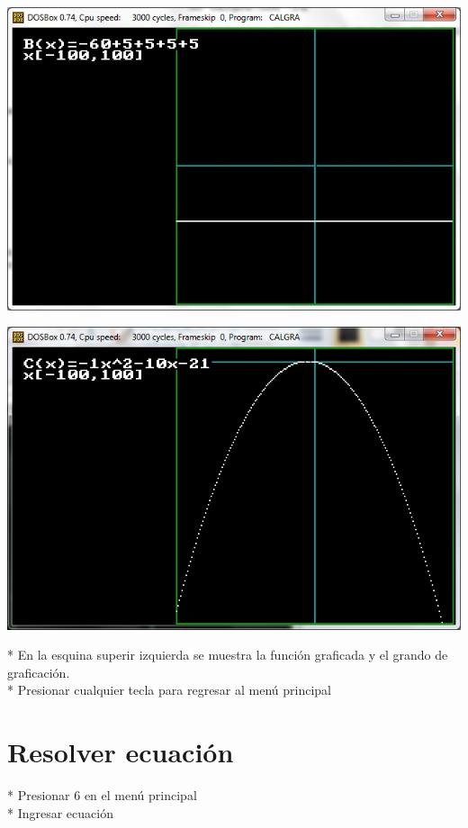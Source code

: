\documentclass[journal]{../../IEEEtran/IEEEtran}
\begin{document}
\includegraphics[scale=0.42]{img/52.jpg}

\includegraphics[scale=0.42]{img/53.jpg}

* En la esquina superir izquierda se muestra la función graficada y el
grando de graficación.\\

* Presionar cualquier tecla para regresar al menú principal\\

\section{Resolver ecuación}

* Presionar 6 en el menú principal\\

* Ingresar ecuación \\
\end{document}
